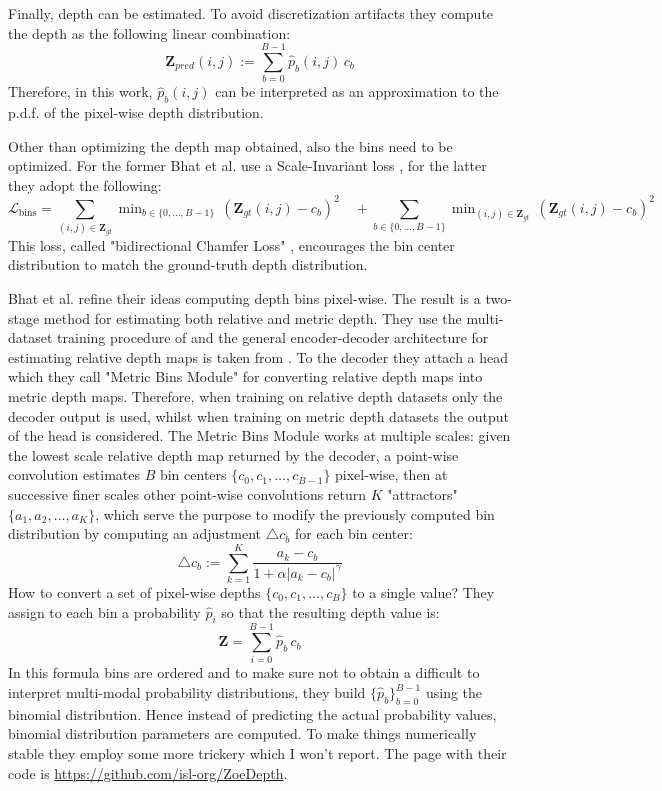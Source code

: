 Finally, depth can be estimated.
To avoid discretization artifacts they compute the depth as the following linear combination:
\[
	\mathbf{Z}_{pred}(i,j) := \sum_{b=0}^{B-1} \hat{p}_{b}(i,j) \, c_{b}
\]
Therefore, in this work, $\hat{p}_{b}(i,j)$ can be interpreted as an approximation to the p.d.f. of the pixel-wise depth distribution.

Other than optimizing the depth map obtained, also the bins need to be optimized.
For the former Bhat et al. use a Scale-Invariant loss \cite{Eigen}, for the latter they adopt the following:
\[
	\mathcal{L}_{\text{bins}} =
	\sum_{(i,j) \in \mathbf{Z}_{gt}} \mathop{\text{min}}_{b \in \{0, \dotsc, B-1\}} \, (\mathbf{Z}_{gt}(i,j) - c_{b})^{2} \quad+
	\sum_{b \in \{0, \dotsc, B-1\}} \mathop{\text{min}}_{(i,j) \in \mathbf{Z}_{gt}} \, (\mathbf{Z}_{gt}(i,j) - c_{b})^{2}
\]
This loss, called "bidirectional Chamfer Loss" \cite{AdaBins}, encourages the bin center distribution to match the ground-truth depth distribution.

Bhat et al. \cite{ZoeDepth} refine their ideas computing depth bins pixel-wise.
The result is a two-stage method for estimating both relative and metric depth.
They use the multi-dataset training procedure of \cite{MiDas} and the general encoder-decoder architecture for estimating relative depth maps is taken from \cite{denseViT}.
To the decoder they attach a head which they call "Metric Bins Module" for converting relative depth maps into metric depth maps.
Therefore, when training on relative depth datasets only the decoder output is used, whilst when training on metric depth datasets the output of the head is considered.
The Metric Bins Module works at multiple scales: given the lowest scale relative depth map returned by the decoder, a point-wise convolution estimates $B$ bin centers $\{c_{0}, c_{1}, \dotsc, c_{B-1}\}$ pixel-wise, then at successive finer scales other point-wise convolutions return $K$ "attractors" $\{a_{1}, a_{2}, \dotsc, a_{K}\}$, which serve the purpose to modify the previously computed bin distribution by computing an adjustment $\triangle c_{b}$ for each bin center:
\[
	\triangle c_{b} := \sum_{k=1}^{K} \frac{a_{k} - c_{b}}{1 + \alpha | a_{k} - c_{b} |^{\gamma}}
\]
How to convert a set of pixel-wise depths $\{c_{0}, c_{1}, \dotsc, c_{B}\}$ to a single value?
They assign to each bin a probability $\hat{p}_{i}$ so that the resulting depth value is:
\[
	\mathbf{Z} = \sum_{i=0}^{B-1} \hat{p}_{b} \, c_{b}
\]
In this formula bins are ordered and to make sure not to obtain a difficult to interpret multi-modal probability distributions, they build $\{\hat{p}_{b}\}_{b=0}^{B-1}$ using the binomial distribution. Hence instead of predicting the actual probability values, binomial distribution parameters are computed.
To make things numerically stable they employ some more trickery which I won't report.
The page with their code is \url{https://github.com/isl-org/ZoeDepth}.